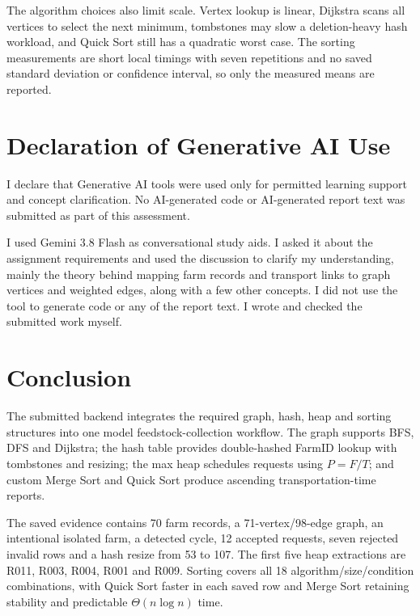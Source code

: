 \documentclass[10pt,a4paper]{article}
\begin{document}
The algorithm choices also limit scale. Vertex lookup is linear, Dijkstra scans all vertices to select the next minimum, tombstones may slow a deletion-heavy hash workload, and Quick Sort still has a quadratic worst case. The sorting measurements are short local timings with seven repetitions and no saved standard deviation or confidence interval, so only the measured means are reported.

\section{Declaration of Generative AI Use}
\label{sec:ai-declaration}

I declare that Generative AI tools were used only for permitted learning support and concept clarification. No AI-generated code or AI-generated report text was submitted as part of this assessment.

I used Gemini 3.8 Flash as conversational study aids. I asked it about the assignment requirements and used the discussion to clarify my understanding, mainly the theory behind mapping farm records and transport links to graph vertices and weighted edges, along with a few other concepts. I did not use the tool to generate code or any of the report text. I wrote and checked the submitted work myself.
\section*{Conclusion}
{}

The submitted backend integrates the required graph, hash, heap and sorting structures into one model feedstock-collection workflow. The graph supports BFS, DFS and Dijkstra; the hash table provides double-hashed FarmID lookup with tombstones and resizing; the max heap schedules requests using $P=F/T$; and custom Merge Sort and Quick Sort produce ascending transportation-time reports.

The saved evidence contains 70 farm records, a 71-vertex/98-edge graph, an intentional isolated farm, a detected cycle, 12 accepted requests, seven rejected invalid rows and a hash resize from 53 to 107. The first five heap extractions are R011, R003, R004, R001 and R009. Sorting covers all 18 algorithm/size/condition combinations, with Quick Sort faster in each saved row and Merge Sort retaining stability and predictable $\Theta(n\log n)$ time.
\end{document}
